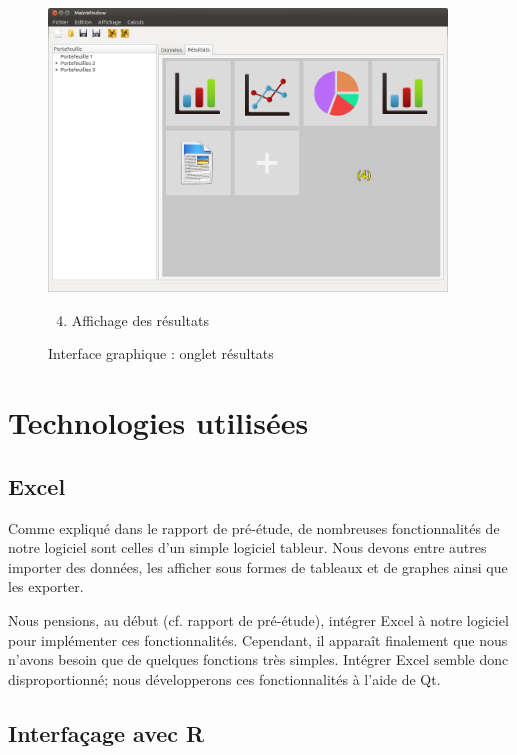 \documentclass[a4paper]{report}
\begin{document}
	\begin{figure}[H]
		\center
		\includegraphics[width=400px]{logicielResultat.png}
		\caption{Interface graphique : onglet résultats}
		\label{fig:interface2}
		\begin{enumerate}
			\setcounter{enumi}{3} 
			\item Affichage des résultats
		\end{enumerate}
	\end{figure}



\section{Technologies utilisées}

\subsection{Excel}

Comme expliqué dans le rapport de pré-étude, de nombreuses fonctionnalités de notre logiciel sont celles d’un simple logiciel tableur.
Nous devons entre autres importer des données, les afficher sous formes de tableaux et de graphes ainsi que les exporter.

Nous pensions, au début (cf. rapport de pré-étude), intégrer Excel à notre logiciel pour implémenter ces fonctionnalités.
Cependant, il apparaît finalement que nous n'avons besoin que de quelques fonctions très simples.
Intégrer Excel semble donc disproportionné; nous développerons ces fonctionnalités à l'aide de Qt.


\subsection{Interfaçage avec R}
\end{document}
